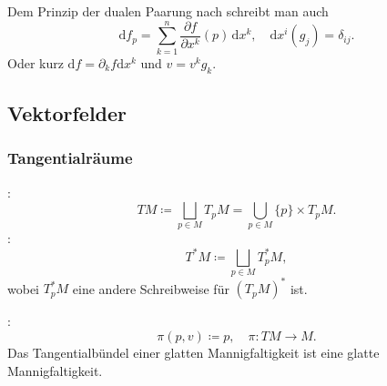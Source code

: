 Dem Prinzip der dualen Paarung nach schreibt man auch%
\begin{equation}
\mathrm df_p = \sum_{k=1}^n \frac{\partial f}{\partial x^k}(p)\,\mathrm dx^k,\quad
\mathrm dx^i(g_j) = \delta_{ij}.
\end{equation}
Oder kurz $\mathrm df = \partial_k f\mathrm dx^k$ und $v=v^k g_k$.

\subsection{Vektorfelder}
\subsubsection{Tangentialräume}

:
\begin{equation}
TM\coloneq \bigsqcup_{p\in M} T_p M = \bigcup_{p\in M} \{p\}\times T_p M.
\end{equation}
:
\begin{equation}
T^*M \coloneq \bigsqcup_{p\in M} T_p^* M,
\end{equation}
wobei $T_p^* M$ eine andere Schreibweise für
$(T_p M)^*$ ist.

:
\begin{equation}
\pi(p,v)\coloneq p,\quad\pi\colon TM\to M.
\end{equation}
Das Tangentialbündel einer glatten Mannigfaltigkeit ist eine
glatte Mannigfaltigkeit.

